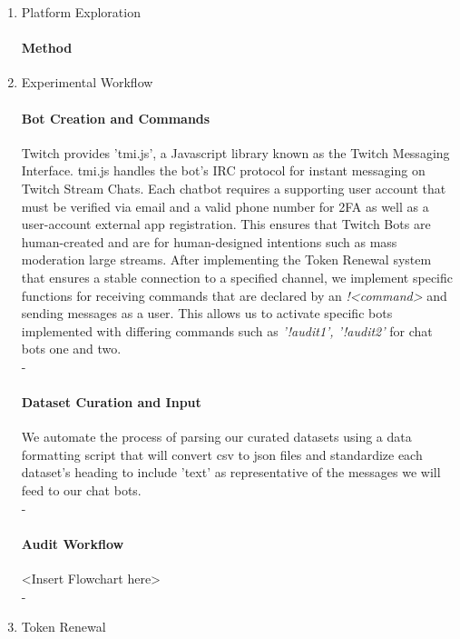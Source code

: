 \begin{enumerate}
\item Platform Exploration
\paragraph{\textbf{Method}}
\item Experimental Workflow
\paragraph{\textbf{Bot Creation and Commands}}
Twitch provides 'tmi.js', a Javascript library known as the Twitch Messaging Interface. tmi.js handles the bot's IRC protocol for instant messaging on Twitch Stream Chats. Each chatbot requires a supporting user account that must be verified via email and a valid phone number for 2FA as well as a user-account external app registration. This ensures that Twitch Bots are human-created and are for human-designed intentions such as mass moderation large streams. After implementing the Token Renewal system that ensures a stable connection to a specified channel, we implement specific functions for receiving commands that are declared by an \textit{!<command>} and sending messages as a user. This allows us to activate specific bots implemented with differing commands such as \textit{'!audit1', '!audit2'} for chat bots one and two. \\
{\color{white}-} 
\paragraph{\textbf{Dataset Curation and Input}}
We automate the process of parsing our curated datasets using a data formatting script that will convert csv to json files and standardize each dataset's heading to include 'text' as representative of the messages we will feed to our chat bots.\\
{\color{white}-} 
\paragraph{\textbf{Audit Workflow}}
<Insert Flowchart here>
\\
{\color{white}-} 
\item Token Renewal

\end{enumerate}
